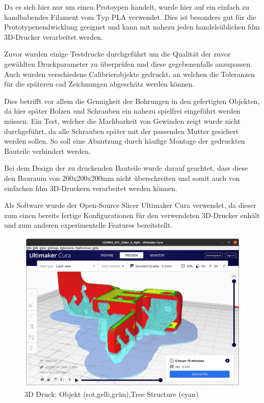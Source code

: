 Da es sich hier nur um einen Protoypen handelt, wurde hier auf ein
einfach zu handbabendes Filament vom Typ PLA verwendet. Dies ist
besonders gut für die Prototypenendwicklung geeignet und kann mit nahezu
jeden handelsüblichen \gls{fdm} 3D-Drucker verarbeitet werden.

Zuvor wurden einige Testdrucke durchgeführt um die Qualität der zuvor
gewählten Druckparameter zu überprüfen und diese gegebenenfalls
anzupassen. Auch wurden verschiedene Calibrierobjekte gedruckt, an
welchen die Toleranzen für die späteren \gls{cad} Zeichnungen abgeschätz
werden können.

Dies betrifft vor allem die Genuigkeit der Bohrungen in den gefertigten
Objekten, da hier später Bolzen und Schrauben ein nahezu spielfrei
eingeführt werden müssen. Ein Test, welcher die Machbarkeit von Gewinden
zeigt wurde nicht durchgeführt, da alle Schrauben später mit der
passenden Mutter gesichert werden sollen. So soll eine Abnutzung durch
häufige Montage der gedruckten Bauteile verhindert werden.

Bei dem Design der zu druckenden Bauteile wurde darauf geachtet, dass
diese den Bauraum von 200x200x200mm nicht überschreiten und somit auch
von einfachen \gls{fdm} 3D-Druckern verarbeitet werden können.

Als Software wurde der Open-Source Slicer Ultimaker Cura
\cite{ultimakercura} verwendet, da dieser zum einen bereits fertige
Konfigurationen für den verwendeten 3D-Drucker enhält und zum anderen
experimentelle Features bereitstellt.

\begin{figure}
\centering
\includegraphics{images/3d_print_tree_structure.png}
\caption{3D Druck: Objekt (rot,gelb,grün),Tree Structure (cyan)
\label{3d_print_tree_structure}}
\end{figure}

